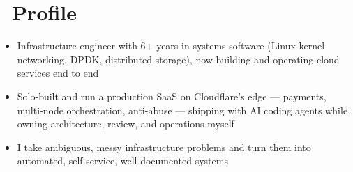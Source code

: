 \documentclass{resume}
\begin{document}



\section{\faRocket\ Profile}
\begin{itemize}[parsep=0.5ex]
	\item Infrastructure engineer with 6+ years in systems software (Linux kernel networking, DPDK, distributed storage), now building and operating cloud services end to end
	\item Solo-built and run a production SaaS on Cloudflare's edge --- payments, multi-node orchestration, anti-abuse --- shipping with AI coding agents while owning architecture, review, and operations myself
	\item I take ambiguous, messy infrastructure problems and turn them into automated, self-service, well-documented systems
\end{itemize}
\end{document}

